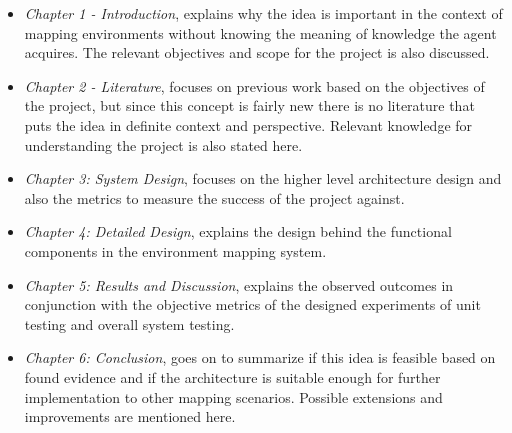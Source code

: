 \begin{itemize}
	\item \textit{Chapter 1 - Introduction}, explains why the idea is important in the context of mapping environments without knowing the meaning of knowledge the agent acquires. The relevant objectives and scope for the project is also discussed. 
	\item \textit{Chapter 2 -  Literature}, focuses on previous work based on the objectives of the project, but since this concept is fairly new there is no literature that puts the idea in definite context and perspective. Relevant knowledge for understanding the project is also stated here.
	
	\item \textit{Chapter 3: System Design}, focuses on the higher level architecture design and also the metrics to measure the success of the project against.
	
	\item \textit{Chapter 4: Detailed Design}, explains the design behind the functional components in the environment mapping system.
	
	
	\item \textit{Chapter 5: Results and Discussion}, explains the observed outcomes in conjunction with the objective metrics of the designed experiments of unit testing and overall system testing.
	
	\item \textit{Chapter 6: Conclusion}, goes on to summarize if this idea is feasible based on found evidence and if the architecture is suitable enough for further implementation to other mapping scenarios. Possible extensions and improvements are mentioned here.
	
\end{itemize}






